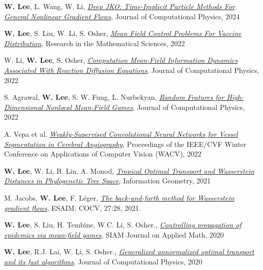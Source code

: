 \begin{cvparagraph}
\begin{cvitems}
    \medskip
  \item \textbf{W. Lee}, L. Wang, W. Li, \href{https://arxiv.org/abs/2311.06700}{\textit{Deep JKO: Time-Implicit Particle Methods For General Nonlinear Gradient Flows}}, Journal of Computational Physics, 2024
    \medskip
  \item \textbf{W. Lee}, S. Liu, W. Li, S. Osher, \href{https://arxiv.org/pdf/2104.11887.pdf}{\textit{Mean Field Control Problems For Vaccine Distribution}}, Research in the Mathematical Sciences, 2022
    \medskip
    \item W. Li, \textbf{W. Lee}, S. Osher, \href{https://arxiv.org/pdf/2107.11501.pdf}{\textit{Computation Mean-Field Information Dynamics Associated With Reaction Diffusion Equations}}, Journal of Computational Physics, 2022
    \medskip
    \item S. Agrawal, \textbf{W. Lee}, S. W. Fung, L. Nurbekyan, \href{https://arxiv.org/abs/2202.12529}{\textit{Random Features for High-Dimensional Nonlocal Mean-Field Games}}, Journal of Computational Physics, 2022
    \medskip
    \item A. Vepa et al. \href{https://openaccess.thecvf.com/content/WACV2022/html/Vepa_Weakly-Supervised_Convolutional_Neural_Networks_for_Vessel_Segmentation_in_Cerebral_Angiography_WACV_2022_paper.html}{\textit{Weakly-Supervised Convolutional Neural Networks for Vessel Segmentation in Cerebral Angiography}}, Proceedings of the IEEE/CVF Winter Conference on Applications of Computer Vision (WACV), 2022
    \medskip
    \item \textbf{W. Lee}, W. Li, B. Lin, A. Monod, \href{https://arxiv.org/pdf/1911.05401v1.pdf}{\textit{Tropical Optimal Transport and Wasserstein Distances in Phylogenetic Tree Space}}, {Information Geometry}, 2021
    \medskip
    \item M. Jacobs, \textbf{W. Lee}, F. Léger, \href{https://arxiv.org/pdf/2011.08151}{\textit{The back-and-forth method for Wasserstein gradient flows}}, {ESAIM: COCV}, 27:28, 2021.
    \medskip
    \item \textbf{W. Lee}, S. Liu, H. Tembine, W.C. Li, S. Osher., \href{https://www.researchgate.net/publication/341804278_Controlling_Propagation_of_epidemics_via_mean-field_games}{\textit{Controlling propagation of epidemics via mean-field games}}, {SIAM Journal on Applied Math}, 2020
    \medskip
    \item \textbf{W. Lee}, R.J. Lai, W. Li, S. Osher., \href{https://www.researchgate.net/publication/338990122_Generalized_Unnormalized_Optimal_Transport_and_its_fast_algorithms}{\textit{Generalized unnormalized optimal transport and its fast algorithms}}, {Journal of Computational Physics}, 2020

\end{cvitems}
\end{cvparagraph}
